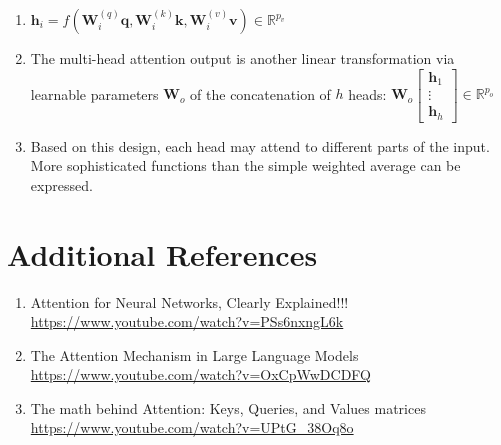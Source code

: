 \begin{enumerate}[itemsep=0.15cm]
    \item $\mathbf{h}_i = f(\mathbf W_i^{(q)}\mathbf q, \mathbf W_i^{(k)}\mathbf k,\mathbf W_i^{(v)}\mathbf v) \in \mathbb R^{p_v}$

    \item The multi-head attention output is another linear transformation via learnable parameters $\mathbf W_o$ of the concatenation of $h$ heads:
    $
        \mathbf W_o \begin{bmatrix}\mathbf h_1\\\vdots\\\mathbf h_h\end{bmatrix} \in \mathbb{R}^{p_o}
    $

    \item Based on this design, each head may attend to different parts of the input.\\
    More sophisticated functions than the simple weighted average can be expressed.
\end{enumerate}








\section*{Additional References}

\begin{enumerate}
    \item Attention for Neural Networks, Clearly Explained!!!\\
    \url{https://www.youtube.com/watch?v=PSs6nxngL6k}

    \item The Attention Mechanism in Large Language Models\\
    \url{https://www.youtube.com/watch?v=OxCpWwDCDFQ}

    \item The math behind Attention: Keys, Queries, and Values matrices\\
    \url{https://www.youtube.com/watch?v=UPtG_38Oq8o}

    
\end{enumerate}







